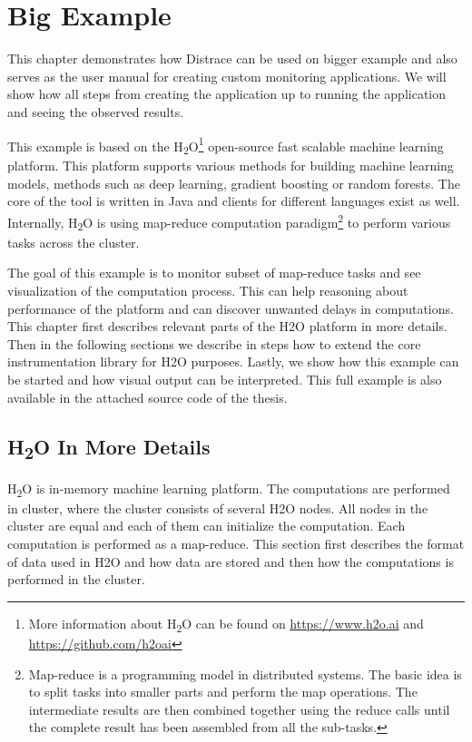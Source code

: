 \chapter{Big Example}
\label{chap:big_example}
This chapter demonstrates how Distrace can be used on bigger example and also serves as the user manual for creating custom monitoring applications. We will show how all steps from creating the application up to running the application and seeing the observed results.

This example is based on the H\textsubscript{2}O\footnote{More information about H\textsubscript{2}O can be found on \url{https://www.h2o.ai} and \url{https://github.com/h2oai}} open-source fast scalable machine learning platform. This platform supports various methods for building machine learning models, methods such as deep learning, gradient boosting or random forests. The core of the tool is written in Java and clients for different languages exist as well. Internally, H\textsubscript{2}O is using map-reduce computation paradigm\footnote{Map-reduce is a programming model in distributed systems. The basic idea is to split tasks into smaller parts and perform the map operations. The intermediate results are then combined together using the reduce calls until the complete result has been assembled from all the sub-tasks.} to perform various tasks across the cluster.

The goal of this example is to monitor subset of map-reduce tasks and see visualization of the computation process. This can help reasoning about performance of the platform and can discover unwanted delays in computations. This chapter first describes relevant parts of the H2O platform in more details. Then in the following sections we describe in steps how to extend the core instrumentation library for H2O purposes. Lastly, we show how this example can be started and how visual output can be interpreted. 
This full example is also available in the attached source code of the thesis.

\section{H\textsubscript{2}O In More Details}
H\textsubscript{2}O is in-memory machine learning platform. The computations are performed in cluster, where the cluster consists of several H2O nodes. All nodes in the cluster are equal and each of them can initialize the computation. Each computation is performed as a map-reduce. This section first describes the format of data used in H2O and how data are stored and then how the computations is performed in the cluster. 

